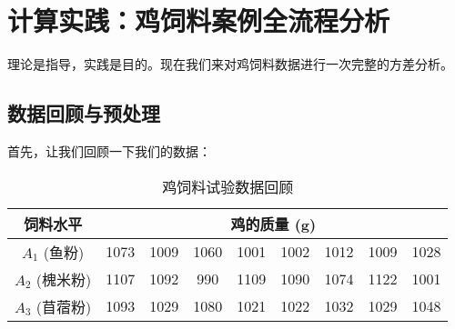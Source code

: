 \documentclass[12pt, a4paper]{amsart}
\begin{document}
\section{计算实践：鸡饲料案例全流程分析}

理论是指导，实践是目的。现在我们来对鸡饲料数据进行一次完整的方差分析。

\subsection{数据回顾与预处理}
首先，让我们回顾一下我们的数据：

\begin{table}[h!]
\centering
\caption{鸡饲料试验数据回顾}
\begin{tabular}{ccccccccc}
\toprule
\textbf{饲料水平} & \multicolumn{8}{c}{\textbf{鸡的质量 (g)}} \\
\midrule
$A_1$ (鱼粉) & 1073 & 1009 & 1060 & 1001 & 1002 & 1012 & 1009 & 1028 \\
$A_2$ (槐米粉) & 1107 & 1092 & 990 & 1109 & 1090 & 1074 & 1122 & 1001 \\
$A_3$ (苜蓿粉) & 1093 & 1029 & 1080 & 1021 & 1022 & 1032 & 1029 & 1048 \\
\bottomrule
\end{tabular}
\end{table}
\end{document}
